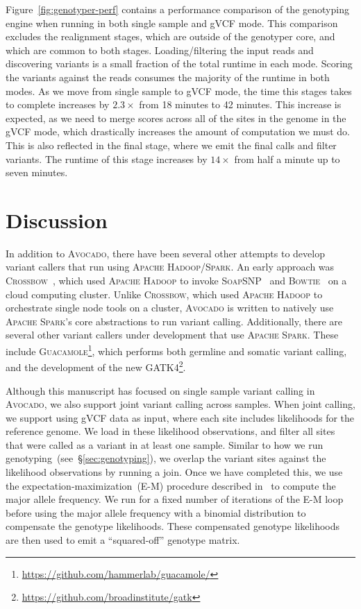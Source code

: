 \documentclass{bioinfo}
\begin{document}
Figure~\ref{fig:genotyper-perf} contains a performance comparison of the
genotyping engine when running in both single sample and gVCF mode. This
comparison excludes the realignment stages, which are outside of the
genotyper core, and which are common to both stages. Loading/filtering the
input reads and discovering variants is a small fraction of the total runtime
in each mode. Scoring the variants against the reads consumes the majority of
the runtime in both modes. As we move from single sample to gVCF mode, the
time this stages takes to complete increases by $2.3\times$ from 18 minutes
to 42 minutes. This increase is expected, as we need to merge scores across
all of the sites in the genome in the gVCF mode, which drastically increases
the amount of computation we must do. This is also reflected in the final
stage, where we emit the final calls and filter variants. The runtime of this
stage increases by $14\times$ from half a minute up to seven minutes.

\section{Discussion}
\label{sec:discussion}

In addition to \textsc{Avocado}, there have been several other attempts to
develop variant callers that run using \textsc{Apache Hadoop/Spark}. An early
approach was \textsc{Crossbow}~\citep{langmead09crossbow}, which used
\textsc{Apache Hadoop} to invoke \textsc{SoapSNP}~\citep{li09snp} and
\textsc{Bowtie}~\citep{langmead09bowtie} on a cloud computing cluster.
Unlike \textsc{Crossbow}, which used \textsc{Apache Hadoop} to orchestrate
single node tools on a cluster, \textsc{Avocado} is written to natively use
\textsc{Apache Spark}'s core abstractions to run variant calling. Additionally,
there are several other variant callers under development that use
\textsc{Apache Spark}. These include
\textsc{Guacamole}\footnote{\url{https://github.com/hammerlab/guacamole/}},
which performs both germline and somatic variant calling, and the development
of the new \textsc{GATK4}\footnote{\url{https://github.com/broadinstitute/gatk}}.

Although this manuscript has focused on single sample variant calling in
\textsc{Avocado}, we also support joint variant calling across samples. When
joint calling, we support using gVCF data as input, where each site includes
likelihoods for the reference genome. We load in these likelihood observations,
and filter all sites that were called as a variant in at least one sample.
Similar to how we run genotyping~(see~\S\ref{sec:genotyping}), we overlap the
variant sites against the likelihood observations by running a join. Once we
have completed this, we use the expectation-maximization~(E-M) procedure
described in~\citet{li11} to compute the major allele frequency. We run for a
fixed number of iterations of the E-M loop before using the major allele
frequency with a binomial distribution to compensate the genotype
likelihoods. These compensated genotype likelihoods are then used to emit
a ``squared-off'' genotype matrix.
\end{document}
